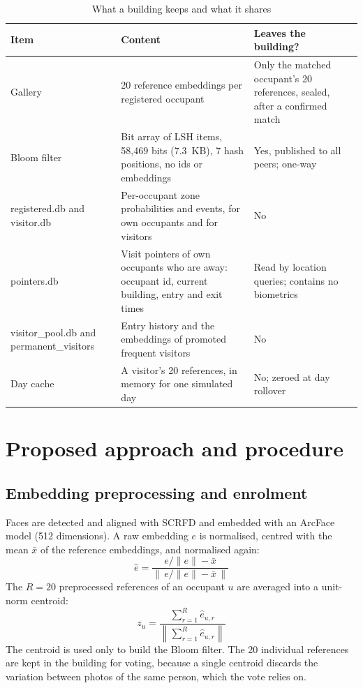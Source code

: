 \documentclass[12pt,a4paper,oneside]{report}
\begin{document}
\begin{table}[htbp]
\centering
\caption{What a building keeps and what it shares}\label{tab:stores}
{\small\setlength{\tabcolsep}{4pt}\renewcommand{\arraystretch}{1.2}
\begin{tabular}{|p{3.52cm}|p{6.06cm}|p{4.69cm}|}\hline
\textbf{Item} & \textbf{Content} & \textbf{Leaves the building?}\\\hline
Gallery & 20 reference embeddings per registered occupant & Only the matched occupant's 20 references, sealed, after a confirmed match\\\hline
Bloom filter & Bit array of LSH items, 58,469 bits (7.3~KB), 7 hash positions, no ids or embeddings & Yes, published to all peers; one-way\\\hline
registered.db and visitor.db & Per-occupant zone probabilities and events, for own occupants and for visitors & No\\\hline
pointers.db & Visit pointers of own occupants who are away: occupant id, current building, entry and exit times & Read by location queries; contains no biometrics\\\hline
visitor\_\allowbreak pool.db and permanent\_\allowbreak visitors & Entry history and the embeddings of promoted frequent visitors & No\\\hline
Day cache & A visitor's 20 references, in memory for one simulated day & No; zeroed at day rollover\\\hline
\end{tabular}}
\end{table}


\section{Proposed approach and procedure}
\subsection{Embedding preprocessing and enrolment}
Faces are detected and aligned with SCRFD \cite{ref18} and embedded with an ArcFace model \cite{ref17} (512 dimensions). A raw embedding $e$ is normalised, centred with the mean $\bar{x}$ of the reference embeddings, and normalised again:
\begin{equation}
\hat{e}=\frac{e/\|e\|-\bar{x}}{\left\|\,e/\|e\|-\bar{x}\,\right\|}
\end{equation}
The $R=20$ preprocessed references of an occupant $u$ are averaged into a unit-norm centroid:
\begin{equation}
z_u=\frac{\sum_{r=1}^{R}\hat{e}_{u,r}}{\left\|\sum_{r=1}^{R}\hat{e}_{u,r}\right\|}
\end{equation}
The centroid is used only to build the Bloom filter. The 20 individual references are kept in the building for voting, because a single centroid discards the variation between photos of the same person, which the vote relies on.
\end{document}
